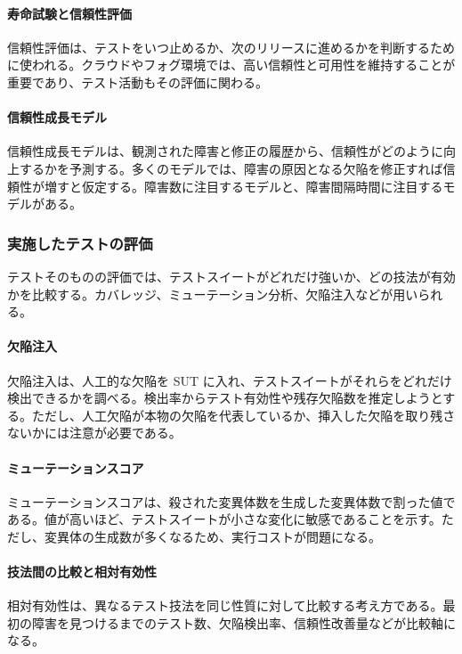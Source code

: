 \paragraph{寿命試験と信頼性評価}
信頼性評価は、テストをいつ止めるか、次のリリースに進めるかを判断するために使われる。クラウドやフォグ環境では、高い信頼性と可用性を維持することが重要であり、テスト活動もその評価に関わる。

\paragraph{信頼性成長モデル}
信頼性成長モデルは、観測された障害と修正の履歴から、信頼性がどのように向上するかを予測する。多くのモデルでは、障害の原因となる欠陥を修正すれば信頼性が増すと仮定する。障害数に注目するモデルと、障害間隔時間に注目するモデルがある。

\subsubsection{実施したテストの評価}
テストそのものの評価では、テストスイートがどれだけ強いか、どの技法が有効かを比較する。カバレッジ、ミューテーション分析、欠陥注入などが用いられる。

\paragraph{欠陥注入}
欠陥注入は、人工的な欠陥を SUT に入れ、テストスイートがそれらをどれだけ検出できるかを調べる。検出率からテスト有効性や残存欠陥数を推定しようとする。ただし、人工欠陥が本物の欠陥を代表しているか、挿入した欠陥を取り残さないかには注意が必要である。

\paragraph{ミューテーションスコア}
ミューテーションスコアは、殺された変異体数を生成した変異体数で割った値である。値が高いほど、テストスイートが小さな変化に敏感であることを示す。ただし、変異体の生成数が多くなるため、実行コストが問題になる。

\paragraph{技法間の比較と相対有効性}
相対有効性は、異なるテスト技法を同じ性質に対して比較する考え方である。最初の障害を見つけるまでのテスト数、欠陥検出率、信頼性改善量などが比較軸になる。
